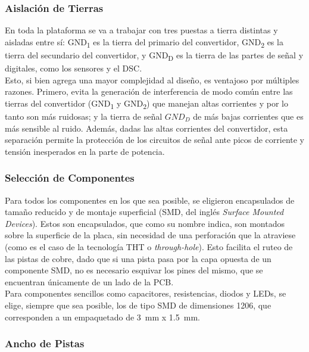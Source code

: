 \subsubsection{Aislación de Tierras}

En toda la plataforma se va a trabajar con tres puestas a tierra distintas y aisladas entre sí: GND\textsubscript{1} es la tierra del primario del convertidor, GND\textsubscript{2} es la tierra del secundario del convertidor, y GND\textsubscript{D} es la tierra de las partes de señal y digitales, como los sensores y el DSC.\\

Esto, si bien agrega una mayor complejidad al diseño, es ventajoso por múltiples razones. Primero, evita la generación de interferencia de modo común entre las tierras del convertidor (GND\textsubscript{1} y GND\textsubscript{2}) que manejan altas corrientes y por lo tanto son más ruidosas; y la tierra de señal $GND_D$ de más bajas corrientes que es más sensible al ruido. Además, dadas las altas corrientes del convertidor, esta separación permite la protección de los circuitos de señal ante picos de corriente y tensión inesperados en la parte de potencia.\\

\subsubsection{Selección de Componentes}

Para todos los componentes en los que sea posible, se eligieron encapsulados de tamaño reducido y de montaje superficial (SMD, del inglés \textit{Surface Mounted Devices}). Estos son encapsulados, que como su nombre indica, son montados sobre la superficie de la placa, sin necesidad de una perforación que la atraviese (como es el caso de la tecnología THT o \textit{through-hole}). Esto facilita el ruteo de las pistas de cobre, dado que si una pista pasa por la capa opuesta de un componente SMD, no es necesario esquivar los pines del mismo, que se encuentran únicamente de un lado de la PCB.\\

Para componentes sencillos como capacitores, resistencias, diodos y LEDs, se elige, siempre que sea posible, los de tipo SMD de dimensiones 1206, que corresponden a un empaquetado de \SI[]{3}[]{\milli\metre} x \SI[]{1.5}[]{\milli\metre}.\\

\subsubsection{Ancho de Pistas}

